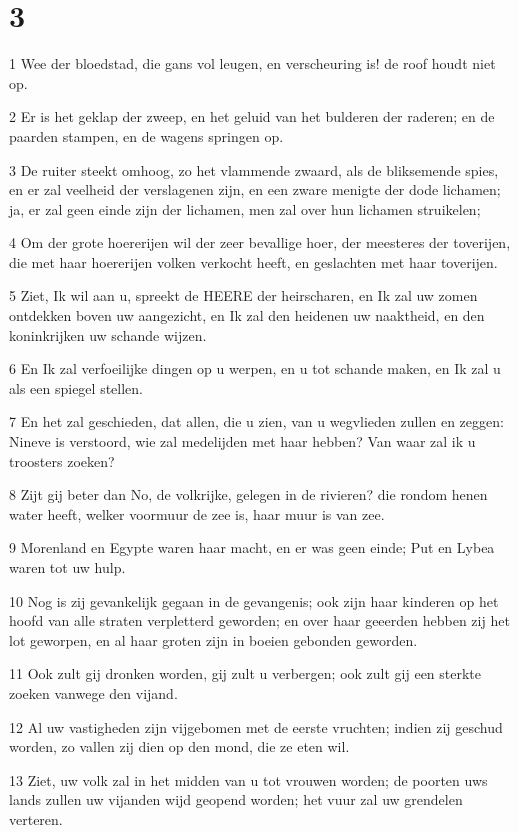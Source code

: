 \chapter{3}

\par 1 Wee der bloedstad, die gans vol leugen, en verscheuring is! de roof houdt niet op.
\par 2 Er is het geklap der zweep, en het geluid van het bulderen der raderen; en de paarden stampen, en de wagens springen op.
\par 3 De ruiter steekt omhoog, zo het vlammende zwaard, als de bliksemende spies, en er zal veelheid der verslagenen zijn, en een zware menigte der dode lichamen; ja, er zal geen einde zijn der lichamen, men zal over hun lichamen struikelen;
\par 4 Om der grote hoererijen wil der zeer bevallige hoer, der meesteres der toverijen, die met haar hoererijen volken verkocht heeft, en geslachten met haar toverijen.
\par 5 Ziet, Ik wil aan u, spreekt de HEERE der heirscharen, en Ik zal uw zomen ontdekken boven uw aangezicht, en Ik zal den heidenen uw naaktheid, en den koninkrijken uw schande wijzen.
\par 6 En Ik zal verfoeilijke dingen op u werpen, en u tot schande maken, en Ik zal u als een spiegel stellen.
\par 7 En het zal geschieden, dat allen, die u zien, van u wegvlieden zullen en zeggen: Nineve is verstoord, wie zal medelijden met haar hebben? Van waar zal ik u troosters zoeken?
\par 8 Zijt gij beter dan No, de volkrijke, gelegen in de rivieren? die rondom henen water heeft, welker voormuur de zee is, haar muur is van zee.
\par 9 Morenland en Egypte waren haar macht, en er was geen einde; Put en Lybea waren tot uw hulp.
\par 10 Nog is zij gevankelijk gegaan in de gevangenis; ook zijn haar kinderen op het hoofd van alle straten verpletterd geworden; en over haar geeerden hebben zij het lot geworpen, en al haar groten zijn in boeien gebonden geworden.
\par 11 Ook zult gij dronken worden, gij zult u verbergen; ook zult gij een sterkte zoeken vanwege den vijand.
\par 12 Al uw vastigheden zijn vijgebomen met de eerste vruchten; indien zij geschud worden, zo vallen zij dien op den mond, die ze eten wil.
\par 13 Ziet, uw volk zal in het midden van u tot vrouwen worden; de poorten uws lands zullen uw vijanden wijd geopend worden; het vuur zal uw grendelen verteren.
